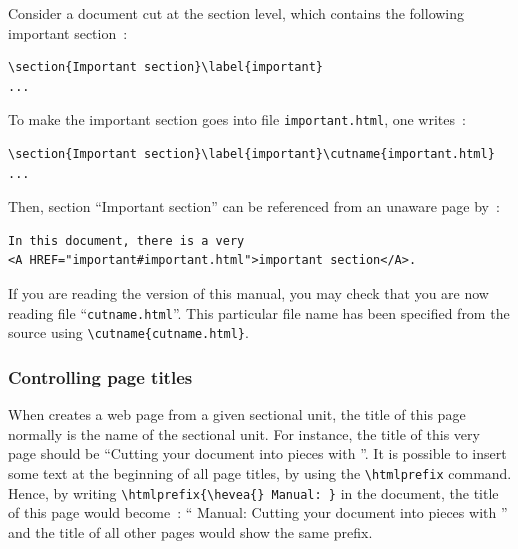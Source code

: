Consider a document cut at the section level, which contains the
following important section~:
\begin{verbatim}
\section{Important section}\label{important}
...
\end{verbatim}
To make the important section goes into file \texttt{important.html},
one writes~:
\begin{verbatim}
\section{Important section}\label{important}\cutname{important.html}
...
\end{verbatim}
Then, section ``Important section'' can be referenced from
an \hevea{} unaware \html{} page by~:
\begin{verbatim}
In this document, there is a very
<A HREF="important#important.html">important section</A>.
\end{verbatim}
\ifhevea
If you are reading the \html{} version of this manual, you may check
that you are now reading file ``\texttt{cutname.html}''.
This particular file name has been specified from the source
using \verb+\cutname{cutname.html}+.
\fi

\subsubsection{Controlling page titles}
When \hacha{} creates a web page from a given sectional unit,
the title of this page normally is the name of the sectional unit.
For instance, the title of this very page should be
``Cutting your document into pieces with \hacha''.
It is possible to insert some text at the beginning of all page
titles, by using the \verb+\htmlprefix+ command.
Hence, by writing
\verb+\htmlprefix{\hevea{} Manual: }+ in the document,
the title of this page would become~:
``\hevea{} Manual: Cutting your document into pieces with \hacha''
and the title of all other pages would show the same prefix.

